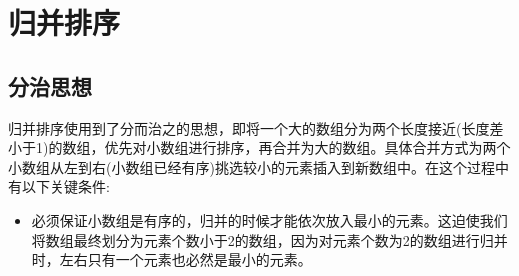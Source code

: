\section{归并排序}

\subsection{分治思想}

归并排序使用到了分而治之的思想，即将一个大的数组分为两个长度接近(长度差小于1)的数组，优先对小数组进行排序，再合并为大的数组。具体合并方式为两个小数组从左到右(小数组已经有序)挑选较小的元素插入到新数组中。在这个过程中有以下关键条件:

\begin{itemize}
  \item 必须保证小数组是有序的，归并的时候才能依次放入最小的元素。这迫使我们将数组最终划分为元素个数小于2的数组，因为对元素个数为2的数组进行归并时，左右只有一个元素也必然是最小的元素。
\end{itemize}

